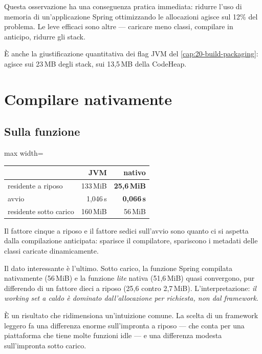 Questa osservazione ha una conseguenza pratica immediata: ridurre l'uso di
memoria di un'applicazione Spring ottimizzando le allocazioni agisce sul 12\% del
problema. Le leve efficaci sono altre --- caricare meno classi, compilare in
anticipo, ridurre gli stack.

\`E anche la giustificazione quantitativa dei flag JVM del
\cref{cap:20-build-packaging}:  agisce sui 23\,MB degli stack,
 sui 13{,}5\,MB della CodeHeap.

\section{Compilare nativamente}

\subsection{Sulla funzione}

\begin{center}
\small
\begin{adjustbox}{max width=\textwidth}
\begin{tabular}{@{}lrr@{}}
\toprule
 & \textbf{JVM} & \textbf{nativo} \\
\midrule
residente a riposo & 133\,MiB & \textbf{25{,}6\,MiB} \\
avvio & 1{,}046\,s & \textbf{0{,}066\,s} \\
residente sotto carico & 160\,MiB & 56\,MiB \\
\bottomrule
\end{tabular}
\end{adjustbox}
\end{center}

Il fattore cinque a riposo e il fattore sedici sull'avvio sono quanto ci si
aspetta dalla compilazione anticipata: sparisce il compilatore, spariscono i
metadati delle classi caricate dinamicamente.

Il dato interessante \`e l'ultimo. Sotto carico, la funzione Spring compilata
nativamente (56\,MiB) e la funzione \emph{lite} nativa (51{,}6\,MiB) quasi
convergono, pur differendo di un fattore dieci a riposo (25{,}6 contro
2{,}7\,MiB). L'interpretazione: \emph{il working set a caldo \`e dominato
dall'allocazione per richiesta, non dal framework}.

\`E un risultato che ridimensiona un'intuizione comune. La scelta di un framework
leggero fa una differenza enorme sull'impronta a riposo --- che conta per una
piattaforma che tiene molte funzioni idle --- e una differenza modesta
sull'impronta sotto carico.

